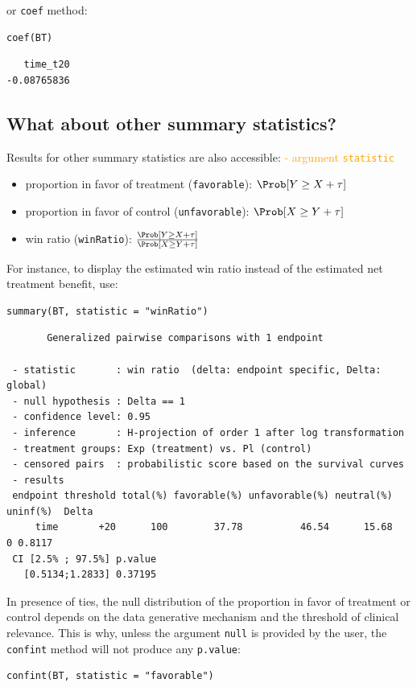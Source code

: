 \documentclass[12pt]{article}
\newcommand\Warning[1][3ex]{%
\renewcommand\stacktype{L}%
\scaleto{\stackon[1.3pt]{\color{red}$\triangle$}{\tiny\bfseries !}}{#1}%
\xspace
}
\begin{document}
or \texttt{coef} method:
\lstset{language=r,label= ,caption= ,captionpos=b,numbers=none}
\begin{lstlisting}
coef(BT)
\end{lstlisting}

\begin{verbatim}
   time_t20 
-0.08765836
\end{verbatim}


\bigskip

\subsection{What about other summary statistics?}
\label{sec:orgbcaeaf2}

Results for other summary statistics are also accessible: \hfill \textcolor{orange}{- argument \texttt{statistic}}
\begin{itemize}
\item proportion in favor of treatment (\texttt{favorable}): \(\Prob[Y\geq X + \tau]\)
\item proportion in favor of control (\texttt{unfavorable}): \(\Prob[X\geq Y + \tau]\)
\item win ratio (\texttt{winRatio}): \(\frac{\Prob[Y\geq X + \tau]}{\Prob[X\geq Y + \tau]}\)
\end{itemize}

\noindent For instance, to display the estimated win ratio instead of
the estimated net treatment benefit, use:
\lstset{language=r,label= ,caption= ,captionpos=b,numbers=none}
\begin{lstlisting}
summary(BT, statistic = "winRatio")
\end{lstlisting}

\begin{verbatim}
       Generalized pairwise comparisons with 1 endpoint

 - statistic       : win ratio  (delta: endpoint specific, Delta: global) 
 - null hypothesis : Delta == 1 
 - confidence level: 0.95 
 - inference       : H-projection of order 1 after log transformation 
 - treatment groups: Exp (treatment) vs. Pl (control) 
 - censored pairs  : probabilistic score based on the survival curves
 - results
 endpoint threshold total(%) favorable(%) unfavorable(%) neutral(%) uninf(%)  Delta
     time       +20      100        37.78          46.54      15.68        0 0.8117
 CI [2.5% ; 97.5%] p.value 
   [0.5134;1.2833] 0.37195
\end{verbatim}

\Warning In presence of ties, the null distribution of the proportion
in favor of treatment or control depends on the data generative
mechanism and the threshold of clinical relevance. This is why, unless
the argument \texttt{null} is provided by the user, the \texttt{confint} method will
not produce any \texttt{p.value}:
\lstset{language=r,label= ,caption= ,captionpos=b,numbers=none}
\begin{lstlisting}
confint(BT, statistic = "favorable")
\end{lstlisting}
\end{document}
